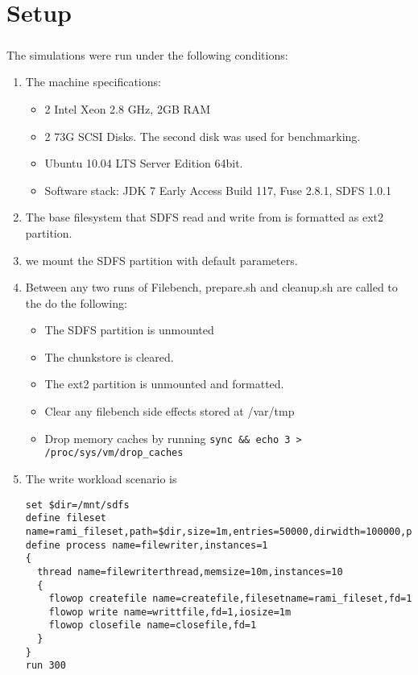 \chapter{Setup}\label{chap:setup}


\paragraph{}
The simulations were run under the following conditions:
\begin{enumerate}
\item The machine specifications:
\begin{itemize}
\item 2 Intel Xeon 2.8 GHz, 2GB RAM
\item 2 73G SCSI Disks. The second disk was used for benchmarking.
\item Ubuntu 10.04 LTS Server Edition 64bit.
\item Software stack: JDK 7 Early Access Build 117, Fuse 2.8.1, SDFS 1.0.1
\end{itemize}
\item The base filesystem that SDFS read and write from is formatted as ext2 partition.

\item we mount the SDFS partition with default parameters. 
\item Between any two runs of Filebench, prepare.sh and cleanup.sh are called to the do the following:
    \begin{itemize}
    \item The SDFS partition is unmounted
    \item The chunkstore is cleared. 
    \item The ext2 partition is unmounted and formatted.
    \item Clear any filebench side effects stored at /var/tmp
    \item Drop memory caches by running \verb+sync && echo 3 > /proc/sys/vm/drop_caches+
    \end{itemize}

\item The write workload scenario is \\
\begin{lstlisting}
set $dir=/mnt/sdfs
define fileset name=rami_fileset,path=$dir,size=1m,entries=50000,dirwidth=100000,prealloc=0,datasource=entro,entropy=7.0
define process name=filewriter,instances=1
{
  thread name=filewriterthread,memsize=10m,instances=10
  {
    flowop createfile name=createfile,filesetname=rami_fileset,fd=1
    flowop write name=writtfile,fd=1,iosize=1m
    flowop closefile name=closefile,fd=1
  }
}
run 300
\end{lstlisting}


\end{enumerate}
